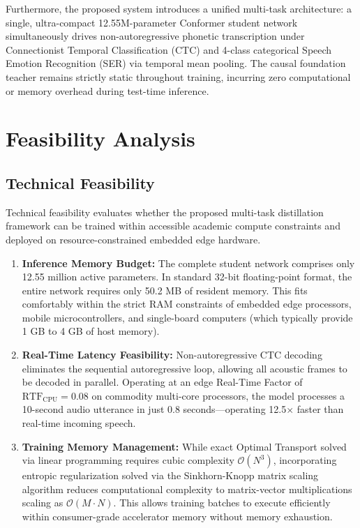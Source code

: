 Furthermore, the proposed system introduces a unified multi-task architecture: a single, ultra-compact 12.55M-parameter Conformer student network simultaneously drives non-autoregressive phonetic transcription under Connectionist Temporal Classification (CTC) and 4-class categorical Speech Emotion Recognition (SER) via temporal mean pooling. The causal foundation teacher remains strictly static throughout training, incurring zero computational or memory overhead during test-time inference.

\section{Feasibility Analysis}

\subsection{Technical Feasibility}
Technical feasibility evaluates whether the proposed multi-task distillation framework can be trained within accessible academic compute constraints and deployed on resource-constrained embedded edge hardware.
\begin{enumerate}
    \item \textbf{Inference Memory Budget:} The complete student network comprises only 12.55 million active parameters. In standard 32-bit floating-point format, the entire network requires only 50.2 MB of resident memory. This fits comfortably within the strict RAM constraints of embedded edge processors, mobile microcontrollers, and single-board computers (which typically provide 1 GB to 4 GB of host memory).
    \item \textbf{Real-Time Latency Feasibility:} Non-autoregressive CTC decoding eliminates the sequential autoregressive loop, allowing all acoustic frames to be decoded in parallel. Operating at an edge Real-Time Factor of $\text{RTF}_{\text{CPU}} = 0.08$ on commodity multi-core processors, the model processes a 10-second audio utterance in just 0.8 seconds—operating 12.5$\times$ faster than real-time incoming speech.
    \item \textbf{Training Memory Management:} While exact Optimal Transport solved via linear programming requires cubic complexity $\mathcal{O}(N^3)$, incorporating entropic regularization solved via the Sinkhorn-Knopp matrix scaling algorithm reduces computational complexity to matrix-vector multiplications scaling as $\mathcal{O}(M \cdot N)$. This allows training batches to execute efficiently within consumer-grade accelerator memory without memory exhaustion.
\end{enumerate}

